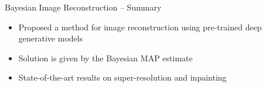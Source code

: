 \begin{frame}{Bayesian Image Reconstruction -- Summary}
 
 \begin{itemize}
  \item Proposed a method for image reconstruction using pre-trained deep generative models
  
  \vt
  
  \item Solution is given by the Bayesian MAP estimate
  
  \vt
  
  \item State-of-the-art results on super-resolution and inpainting
  
 \end{itemize}

 
\end{frame}




